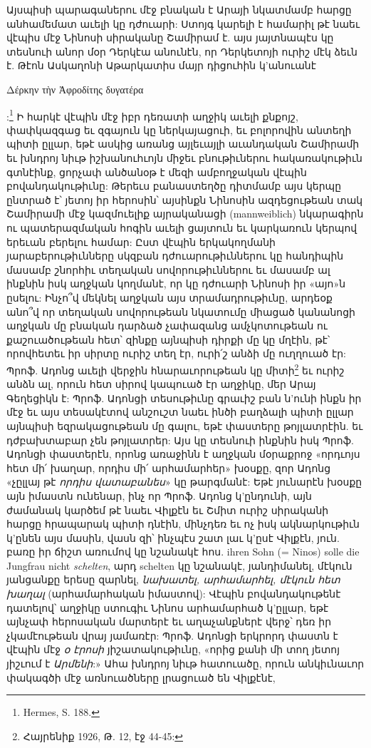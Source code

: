 \documentclass{article}
\begin{document}
{Այսպիսի պարագաներու մէջ բնական է Արայի նկատմամբ հարցը անհամեմատ աւելի կը դժուարի: Ստոյգ կարելի է համարիլ թէ նաեւ վէպիս մէջ Նինոսի սիրականը Շամիրամ է. այս յայտնապէս կը տեսնուի անոր մօր Դերկէա անունէն, որ Դերկետոյի ուրիշ մէկ ձեւն է. Թէոն Ասկաղոնի Աթարկատիս մայր դիցուհին կ'անուանէ \begin{greek}Δέρκην τὴν Ἀφροδίτης δυγατέρα\end{greek}:\footnote{Hermes, S. 188.} Ի հարկէ վէպին մէջ իբր դեռատի աղջիկ աւելի քնքոյշ, փափկազգաց եւ զգայուն կը ներկայացուի, եւ բոլորովին անտեղի պիտի ըլլար, եթէ ասկից առանց այլեւայլի աւանդական Շամիրամի եւ խնդրոյ նիւթ իշխանուհւոյն միջեւ բնութիւներու հակառակութիւն գտնէինք, ցորչափ անծանօթ է մեզի ամբողջական վէպին բովանդակութիւնը: Թերեւս բանաստեղծը դիտմամբ այս կերպը ընտրած է՝ յետոյ իր հերոսին՝ այսինքն Նինոսին ազդեցութեան տակ Շամիրամի մէջ կազմուելիք այրականացի (mannweiblich) նկարագիրն ու պատերազմական հոգին աւելի ցայտուն եւ կարկառուն կերպով երեւան բերելու համար: Ըստ վէպին երկակողմանի յարաբերութիւնները սկզբան դժուարութիւններու կը հանդիպին մասամբ շնորհիւ տեղական սովորութիւններու եւ մասամբ ալ ինքնին իսկ աղջկան կողմանէ, որ կը դժուարի Նինոսի իր «այո»ն ըսելու: Ինչո՞վ մեկնել աղջկան այս տրամադրութիւնը, արդեօք անո՞վ որ տեղական սովորութեան նկատումը միացած կանանոցի աղջկան մը բնական դարձած չափազանց ամչկոտութեան ու քաշուածութեան հետ՝ զինքը այնպիսի դիրքի մը կը մղէին, թէ՝ որովհետեւ իր սիրտը ուրիշ տեղ էր, ուրի՛շ անձի մը ուղղուած էր: Պրոֆ. Ադոնց աւելի վերջին հնարաւորութեան կը միտի\footnote{Հայրենիք 1926, Թ. 12, էջ 44-45:} եւ ուրիշ անձն ալ, որուն հետ սիրով կապուած էր աղջիկը, մեր Արայ Գեղեցիկն է: Պրոֆ. Ադոնցի տեսութիւնը գրաւիշ բան ն'ունի ինքն իր մէջ եւ այս տեսակէտով անշուշտ նաեւ ինծի բաղձալի պիտի ըլլար այնպիսի եզրակացութեան մը գալու, եթէ փաստերը թոյլատրէին. եւ դժբախտաբար չեն թոյլատրեր: Այս կը տեսնուի ինքնին իսկ Պրոֆ. Ադոնցի փաստերէն, որոնց առաջինն է աղջկան մօրաքրոջ «որդւոյս հետ մի՛ խաղար, որդիս մի՛ արհամարհեր» խօսքը, զոր Ադոնց «չըլլայ թէ \emph{որդիս վատաբանես}» կը թարգմանէ: Եթէ յունարէն խօսքը այն իմաստն ունենար, ինչ որ Պրոֆ. Ադոնց կ'ընդունի, այն ժամանակ կարծեմ թէ նաեւ Վիլքէն եւ Շմիտ ուրիշ սիրականի հարցը հրապարակ պիտի դնէին, մինչդեռ եւ ոչ իսկ ակնարկութիւն կ'ընեն այս մասին, վասն զի՝ ինչպէս շատ լաւ կ'ըսէ Վիլքէն, յուն. բառը իր ճիշտ առումով կը նշանակէ հոս. ihren Sohn (= Ninos) solle die Jungfrau nicht \emph{schelten}, արդ schelten կը նշանակէ, յանդիմանել, մէկուն յանցանքը երեսը զարնել, \emph{նախատել, արհամարհել, մէկուն հետ խաղալ} (արհամարհական իմաստով): Վէպին բովանդակութենէ դատելով՝ աղջիկը ստուգիւ Նինոս արհամարհած կ'ըլլար, եթէ այնչափ հերոսական մարտերէ եւ աղաչանքներէ վերջ՝ դեռ իր չկամէութեան վրայ յամառէր: Պրոֆ. Ադոնցի երկրորդ փաստն է վէպին մէջ \emph{օ էրոսի} յիշատակութիւնը, «որից քանի մի տող յետոյ յիշւում է \emph{Արմենի}:» Ահա խնդրոյ նիւթ հատուածը, որուն անկիւնաւոր փակագծի մէջ առնուածները լրացուած են Վիլքէնէ,}
\end{document}

